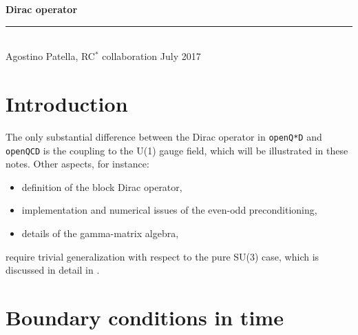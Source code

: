 \documentclass[11pt,fleqn]{article}
\begin{document}
\vspace*{20mm}

{
\sffamily
\huge
\textbf{Dirac operator}
\\
\rule{\textwidth}{1pt}
\\[2mm]
\large
Agostino Patella, RC$^*$ collaboration
\hfill
July 2017
}

\vspace{20mm}



\section{Introduction}

The only substantial difference between the Dirac operator in \texttt{openQ*D} and \texttt{openQCD} is the coupling to the U(1) gauge field, which will be illustrated in these notes. Other aspects, for instance:
\begin{itemize}
   \item definition of the block Dirac operator,
   \item implementation and numerical issues of the even-odd preconditioning,
   \item details of the gamma-matrix algebra,
\end{itemize}
require trivial generalization with respect to the pure SU(3) case, which is discussed in detail in \cite{openQCD:dirac}.


\section{Boundary conditions in time}
\end{document}
